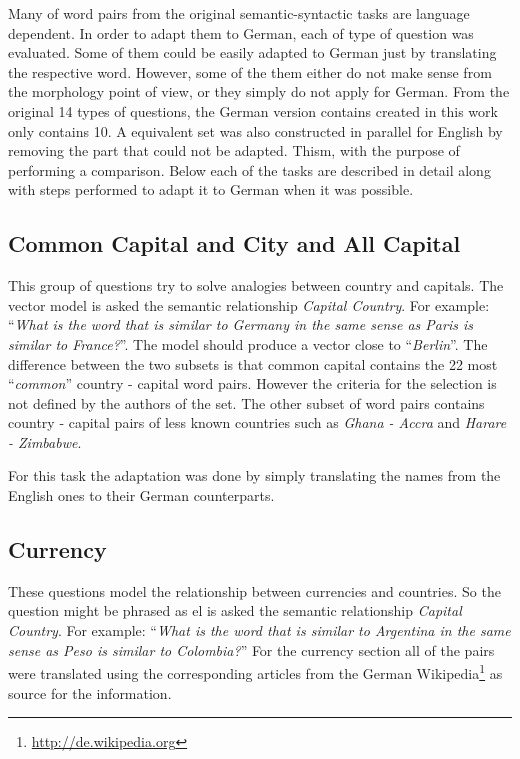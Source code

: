 Many of  word pairs  from the original  semantic-syntactic tasks  are language
dependent. In order to adapt them to German,  each of type of question was
evaluated.  Some of them could  be easily adapted to German
just by translating the respective word. However, some of the them either do
not make sense  from the morphology point of view,  or they simply do not
apply for German. From the original 14 types of questions, the German version 
contains created in this work only contains 10. A equivalent set was also
constructed in parallel for  English by removing the part that could not be
adapted. Thism,  with the purpose of performing a comparison. Below each of the tasks are described
in detail along with steps performed to adapt it to  German when it was possible.

\subsection{Common Capital and City and All Capital}
\label{sec:sub_sec_common_capital_country}

This group of questions try to solve analogies between country and capitals.
The vector model is asked the semantic relationship \emph{Capital Country}.
For example:  ``\emph{What is the word that is similar to
Germany in the same sense as Paris is similar to France?}''. The model should
produce a vector close to ``\emph{Berlin}''. The
difference between the two subsets is that common capital contains
 the 22 most ``\textit{common}'' country - capital word pairs. However the
 criteria for the selection is not defined by the authors of the set. The
 other subset of word pairs contains country - capital pairs of less known countries such
 as \textit{Ghana  -  Accra} and  \textit{Harare -  Zimbabwe}.

For this task the adaptation was done by simply translating the names from
the English ones to their German counterparts. 

\subsection{Currency}
\label{sec:sub_sec_currency}
These questions model the relationship between currencies and countries.  So
the question might be phrased as el is asked the semantic relationship \emph{Capital Country}.
For example:  ``\emph{What is the word that is similar to
Argentina in the same sense as Peso is similar to Colombia?}''
For the currency section all of the pairs were translated using the
corresponding articles from the German 
Wikipedia\footnote{\url{http://de.wikipedia.org}}  as source for the information. 

